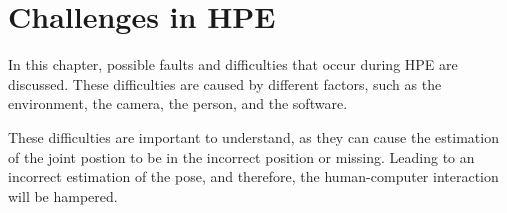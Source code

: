 \section{Challenges in HPE}
\label{sec:errors}

In this chapter, possible faults and difficulties that occur during HPE are discussed. These difficulties are caused by different factors, such as the environment, the camera, the person, and the software. 

These difficulties are important to understand, as they can cause the estimation of the joint postion to be in the incorrect position or missing. Leading to an incorrect estimation of the pose, and therefore, the human-computer interaction will be hampered.



